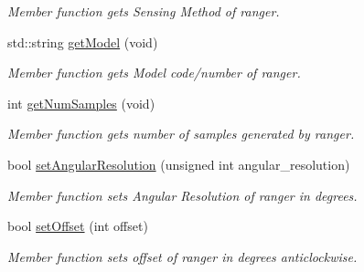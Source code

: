 \begin{DoxyCompactItemize}
\begin{DoxyCompactList}\small\item\em Member function gets Sensing Method of ranger. \end{DoxyCompactList}\item 
std\+::string \hyperlink{classRanger_a00c1e787c323b1e1aa28333059fc4db5}{get\+Model} (void)
\begin{DoxyCompactList}\small\item\em Member function gets Model code/number of ranger. \end{DoxyCompactList}\item 
int \hyperlink{classRanger_a03853a4887526a902a74bcb382b3827f}{get\+Num\+Samples} (void)
\begin{DoxyCompactList}\small\item\em Member function gets number of samples generated by ranger. \end{DoxyCompactList}\item 
bool \hyperlink{classRanger_abdf55e94ac5eea022f1ea229400f8f7c}{set\+Angular\+Resolution} (unsigned int angular\+\_\+resolution)
\begin{DoxyCompactList}\small\item\em Member function sets Angular Resolution of ranger in degrees. \end{DoxyCompactList}\item 
bool \hyperlink{classRanger_ae667f15d757a2c353ff8a2d0eed62055}{set\+Offset} (int offset)
\begin{DoxyCompactList}\small\item\em Member function sets offset of ranger in degrees anticlockwise. \end{DoxyCompactList}\end{DoxyCompactItemize}
